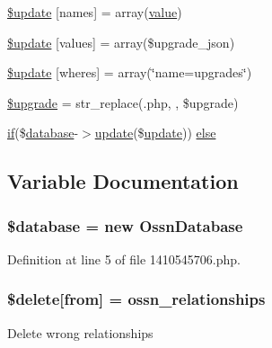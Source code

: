 \begin{DoxyCompactItemize}
\item 
\hyperlink{1410545706_8php_abcf5ad2e4fef35de04bef0168cc91ddc}{\$update} \mbox{[}\textquotesingle{}names\textquotesingle{}\mbox{]} = array(\textquotesingle{}\hyperlink{fullpage_2plugin_8min_8js_ac56c57897e10f699d124e0103921aa20}{value}\textquotesingle{})
\item 
\hyperlink{1410545706_8php_ac82a75b4c6df37380ff77c88f041785e}{\$update} \mbox{[}\textquotesingle{}values\textquotesingle{}\mbox{]} = array(\$upgrade\+\_\+json)
\item 
\hyperlink{1410545706_8php_aacde4479a904b32d0f24dea4e01f148c}{\$update} \mbox{[}\textquotesingle{}wheres\textquotesingle{}\mbox{]} = array(\char`\"{}name=\textquotesingle{}upgrades\textquotesingle{}\char`\"{})
\item 
\hyperlink{1410545706_8php_a9084097ce600d3cc7a79a20ecaea9906}{\$upgrade} = str\+\_\+replace(\textquotesingle{}.php\textquotesingle{}, \textquotesingle{}\textquotesingle{}, \$upgrade)
\item 
\hyperlink{jquery_8tokeninput_8js_ad8dd46a3cbc004569e34401e9e71771a}{if}(\$\hyperlink{ossn_8config_8db_8example_8php_a4e0ca996705612048240f76ff8d4da95}{database}-\/$>$\hyperlink{_chart_8_doughnut_8js_ad58a8121caa8678969d1ff32848a77c4}{update}(\$\hyperlink{_chart_8_doughnut_8js_ad58a8121caa8678969d1ff32848a77c4}{update})) \hyperlink{1410545706_8php_aa7c58ee9f19ec0c0f3a1951839273e79}{else}
\end{DoxyCompactItemize}


\subsection{Variable Documentation}
\subsubsection[{\texorpdfstring{\$database}{$database}}]{\setlength{\rightskip}{0pt plus 5cm}\${\bf database} = new {\bf Ossn\+Database}}\hypertarget{1410545706_8php_a7691c0162d89de0b6ba47edcd8ba8878}{}\label{1410545706_8php_a7691c0162d89de0b6ba47edcd8ba8878}


Definition at line 5 of file 1410545706.\+php.

\subsubsection[{\texorpdfstring{\$delete}{$delete}}]{\setlength{\rightskip}{0pt plus 5cm}\$delete\mbox{[}\textquotesingle{}from\textquotesingle{}\mbox{]} = \textquotesingle{}ossn\+\_\+relationships\textquotesingle{}}\hypertarget{1410545706_8php_ac228c31a229875fce5416792b17c9eee}{}\label{1410545706_8php_ac228c31a229875fce5416792b17c9eee}
Delete wrong relationships

